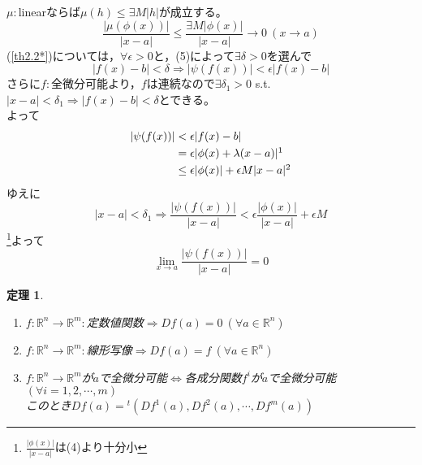 \documentclass[dvipdfmx,a4j,10pt]{jsarticle}
\makeatletter
\theoremstyle{mystyle1}
\newtheorem{thm}[dfn]{定理}
\theoremstyle{mystyle2}
\renewenvironment{proof}[1][\proofname]{\par
  \pushQED{\qed}%
  \normalfont
  \topsep6\p@\@plus6\p@ \trivlist
  \item[\hskip\labelsep{\bfseries\sffamily #1}]\ignorespaces
}{%
  \popQED\endtrivlist\@endpefalse
}
\renewcommand\proofname{証明}
\makeatother
\begin{document}
\begin{proof}
$\mu:$linearならば$\mu(h)\leq\exists M|h|$が成立する。
\[
\frac{|\mu(\phi(x))|}{|x-a|}\leq\frac{\exists M|\phi(x)|}{|x-a|}\to0\ (x\to a)
\]
(\ref{th2.2*})については，$\forall\epsilon>0$と，(5)によって$\exists\delta>0$を選んで
\[
|f(x)-b|<\delta\Rightarrow|\psi(f(x))|<\epsilon|f(x)-b|
\]
さらに$f:$全微分可能より，$f$は連続なので$\exists\delta_1>0$ s.t. $|x-a|<\delta_1\Rightarrow|f(x)-b|<\delta$とできる。\\
よって
\[
\begin{split}
|\psi(f(x))| &< \epsilon|f(x)-b|\\
&= \epsilon|\phi(x)+\lambda(x-a)|\footnotemark\\
&\leq \epsilon|\phi(x)|+\epsilon M|x-a|\footnotemark
\end{split}
\]
ゆえに
\[
|x-a|<\delta_1\Rightarrow\frac{|\psi(f(x))|}{|x-a|}<\epsilon\frac{|\phi(x)|}{|x-a|}+\epsilon M
\]
\footnote{
$\frac{|\phi(x)|}{|x-a|}$は(4)より十分小
}よって
\[
\lim_{x\to a}\frac{|\psi(f(x))|}{|x-a|}=0
\]
\end{proof}

\newpage

\begin{framed}
	\begin{thm}\label{th2.3}\
		\begin{enumerate}
			\item $f:\mathbb{R}^n\to\mathbb{R}^m:$定数値関数$\Rightarrow Df(a)=0\ (\forall a\in\mathbb{R}^n)$
			\item $f:\mathbb{R}^n\to\mathbb{R}^m:$線形写像$\Rightarrow Df(a)=f\ (\forall a\in\mathbb{R}^n)$
			\item $f:\mathbb{R}^n\to\mathbb{R}^m$が$a$で全微分可能$\Leftrightarrow$各成分関数$f^i$が$a$で全微分可能$(\forall i=1,2,\cdots,m)$\\
			このとき$Df(a)={}^{t}(Df^1(a),Df^2(a),\cdots,Df^m(a))$
		\end{enumerate}
	\end{thm}
\end{framed}
\end{document}
